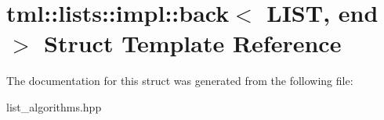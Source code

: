 \hypertarget{structtml_1_1lists_1_1impl_1_1back}{\section{tml\+:\+:lists\+:\+:impl\+:\+:back$<$ L\+I\+S\+T, end $>$ Struct Template Reference}
\label{structtml_1_1lists_1_1impl_1_1back}
}


The documentation for this struct was generated from the following file\+:\begin{DoxyCompactItemize}
\item 
list\+\_\+algorithms.\+hpp\end{DoxyCompactItemize}
